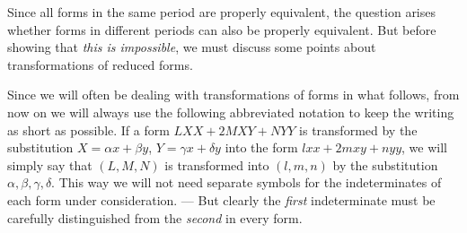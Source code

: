 Since all forms in the same period are properly equivalent, the question arises whether forms in different periods can also be properly equivalent. But before showing that \textit{this is impossible}, we must discuss some points about transformations of reduced forms.

Since we will often be dealing with transformations of forms in what follows, from now on we will always use the following abbreviated notation to keep the writing as short as possible. If a form $LXX+2MXY+NYY$ is transformed by the substitution $X=\alpha x+\beta y$, $Y=\gamma x+\delta y$ into the form $lxx+2mxy+nyy$, we will simply say that $(L,M,N)$ is transformed into $(l,m,n)$ by the substitution $\alpha,\beta,\gamma,\delta$. This way we will not need separate symbols for the indeterminates of each form under consideration. --- But clearly the \textit{first} indeterminate must be carefully distinguished from the \textit{second} in every form.

